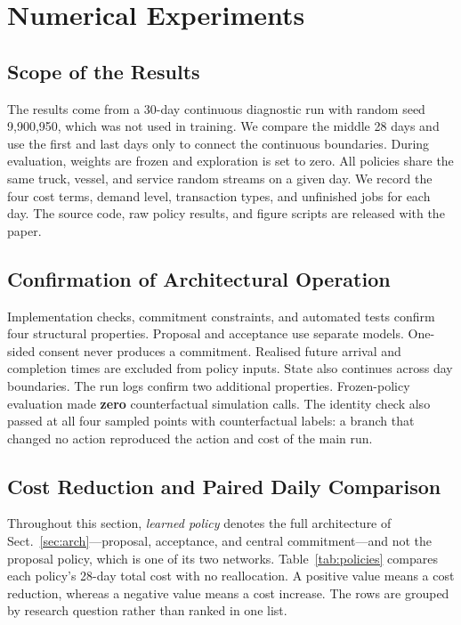 \section{Numerical Experiments}
\label{sec:exp}

\subsection{Scope of the Results}
\label{sec:exp-scope}
The results come from a 30-day continuous diagnostic run with random seed
9{,}900{,}950, which was not used in training. We compare the middle 28
days and use the first and last days only to connect the continuous
boundaries. During evaluation, weights are frozen and exploration is set
to zero. All policies share the same truck, vessel, and service random
streams on a given day. We record the four cost terms, demand level,
transaction types, and unfinished jobs for each day. The source code,
raw policy results, and figure scripts are released with the paper.

\subsection{Confirmation of Architectural Operation}
\label{sec:exp-confirm}
Implementation checks, commitment constraints, and automated tests
confirm four structural properties. Proposal and acceptance use separate
models. One-sided consent never produces a commitment. Realised future
arrival and completion times are excluded from policy inputs. State also
continues across day boundaries. The run logs confirm two additional
properties. Frozen-policy evaluation made \textbf{zero} counterfactual
simulation calls. The identity check also passed at all four sampled
points with counterfactual labels: a branch that changed no action
reproduced the action and cost of the main run.

\subsection{Cost Reduction and Paired Daily Comparison}
\label{sec:exp-paired}
Throughout this section, \emph{learned policy} denotes the full
architecture of Sect.~\ref{sec:arch}---proposal, acceptance, and central
commitment---and not the proposal policy, which is one of its two
networks. Table~\ref{tab:policies} compares each policy's 28-day total
cost with no reallocation. A positive value means a cost reduction, whereas a
negative value means a cost increase. The rows are grouped by research
question rather than ranked in one list.

